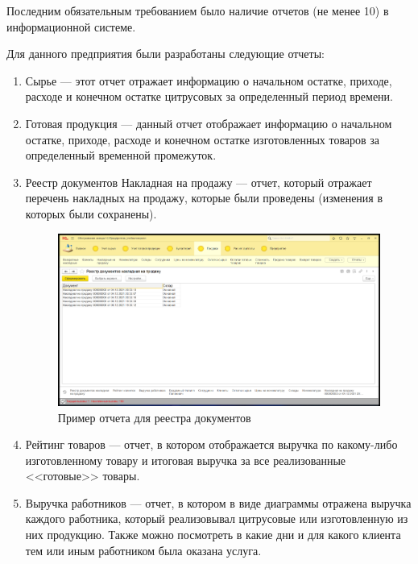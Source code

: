 \documentclass[12pt,a4paper]{article}
\begin{document}
Последним обязательным требованием было наличие отчетов (не менее 10) в информационной системе.

Для данного предприятия были разработаны следующие отчеты:

\begin{enumerate}
    \item Сырье --- этот отчет отражает информацию о начальном остатке, приходе, расходе и конечном остатке цитрусовых за определенный период времени.
    
    \item Готовая продукция --- данный отчет отображает информацию о начальном остатке, приходе, расходе и конечном остатке изготовленных товаров за определенный временной промежуток.
    
    \item Реестр документов Накладная на продажу --- отчет, который отражает перечень накладных на продажу, которые были проведены (изменения в которых были сохранены).
    
    \begin{figure}[!ht]
        \centering
        \includegraphics[scale=0.4]{Пример отчета-реестра.png}
        \caption{Пример отчета для реестра документов}
        \label{fig:registry}
    \end{figure}
    
    \item Рейтинг товаров --- отчет, в котором отображается выручка по какому-либо изготовленному товару и итоговая выручка за все реализованные <<готовые>> товары.
    
    \item Выручка работников --- отчет, в котором в виде диаграммы отражена выручка каждого работника, который реализовывал цитрусовые или изготовленную из них продукцию. Также можно посмотреть в какие дни и для какого клиента тем или иным работником была оказана услуга.
    

\end{enumerate}
\end{document}
